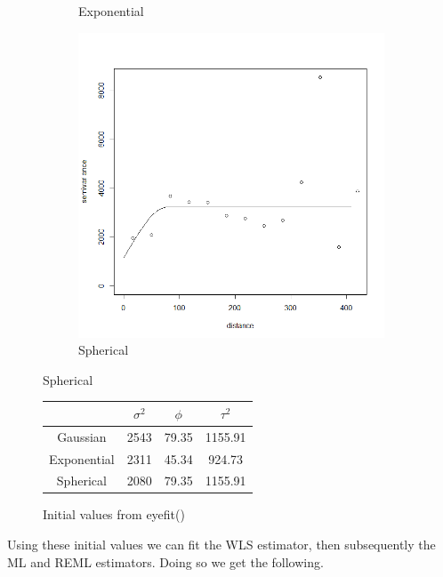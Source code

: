 \documentclass[12pt]{article}
\makeatletter
\theoremstyle{homework}
\newenvironment{exercise}[1]
{\def\@currentlabel{#1}\exercisecore}
{\endexercisecore}
\makeatother
\begin{document}
\begin{exercise}{2}
\begin{figure}[H]
\begin{subfigure}[b]{0.45\textwidth}
        \caption{Exponential}
    \end{subfigure}
    \hfill
    \begin{subfigure}[b]{0.45\textwidth}
        \centering
        \includegraphics[width=\textwidth]{Spherical.png}
        \caption{Spherical}
    \end{subfigure}
\end{figure}

\begin{figure}[H]
  \begin{center}
    \caption{Initial values from eyefit()}
  \begin{tabular}{|c||c|c|c| }
    \hline
     & $\sigma^2$ & $\phi$ & $\tau^2$\\
    \hline 
    \hline
    Gaussian    & 2543 & 79.35 & 1155.91 \\   
    Exponential & 2311 & 45.34 & 924.73\\ 
    Spherical   & 2080 & 79.35 &  1155.91\\ 
    \hline
   \end{tabular}
  \end{center}
\end{figure}

Using these initial values we can fit the WLS estimator, 
then subsequently the ML and REML estimators. Doing so we get the following.


\end{exercise}
\end{document}
